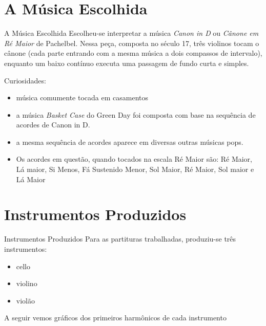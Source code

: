 \documentclass{beamer}
\begin{document}
\section{A Música Escolhida}
\begin{frame}{A Música Escolhida}
Escolheu-se interpretar a música \emph{Canon in D} ou \emph{Cânone em Ré Maior}  de Pachelbel. Nessa peça, composta no século 17, três violinos tocam o cânone (cada parte entrando com a mesma música a dois compassos de intervalo), enquanto um baixo contínuo executa uma passagem de fundo curta e simples.


Curiosidades:
\begin{itemize}
	\item música comumente tocada em casamentos
	\item a música \emph{Basket Case} do Green Day foi composta com base na sequência
	de acordes de Canon in D.
	\item a mesma sequência de acordes aparece em diversas outras músicas pops.
	\item Os acordes em questão, quando tocados na escala Ré Maior são: Ré Maior, Lá maior, Si Menos, Fá Sustenido Menor, Sol Maior, Ré Maior, Sol maior e Lá Maior 
\end{itemize}
\end{frame}

\section{Instrumentos Produzidos}
\begin{frame}{Instrumentos Produzidos}
Para as partituras trabalhadas, produziu-se três instrumentos:
\begin{itemize}
	\item cello
	\item violino
	\item violão
\end{itemize}

A seguir vemos gráficos dos primeiros harmônicos de cada instrumento
\end{frame}
\end{document}
